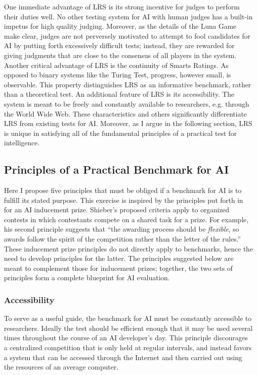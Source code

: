 One immediate advantage of LRS is its strong incentive for judges to perform their duties well. No other testing system for AI with human judges has a built-in impetus for high quality judging. Moreover, as the details of the Luna Game make clear, judges are not perversely motivated to attempt to fool candidates for AI by putting forth excessively difficult tests; instead, they are rewarded for giving judgments that are close to the consensus of all players in the system. Another critical advantage of LRS is the continuity of Smarts Ratings. As opposed to binary systems like the Turing Test, progress, however small, is observable. This property distinguishes LRS as an informative benchmark, rather than a theoretical test. An additional feature of LRS is its accessibility. The system is meant to be freely and constantly available to researchers, e.g. through the World Wide Web. These characteristics and others significantly differentiate LRS from existing tests for AI. Moreover, as I argue in the following section, LRS is unique in satisfying all of the fundamental principles of a practical test for intelligence.

\subsection{Principles of a Practical Benchmark for AI}

Here I propose five principles that must be obliged if a benchmark for AI is to fulfill its stated purpose. This exercise is inspired by the principles put forth in \citet{shieber2015} for an AI inducement prize. Shieber's proposed criteria apply to organized contests in which contestants compete on a shared task for a prize. For example, his second principle suggests that ``the awarding process should be \textit{flexible}, so awards follow the spirit of the competition rather than the letter of the rules.'' These inducement prize principles do not directly apply to benchmarks, hence the need to develop principles for the latter. The principles suggested below are meant to complement those for inducement prizes; together, the two sets of principles form a complete blueprint for AI evaluation.

\subsubsection{Accessibility}
To serve as a useful guide, the benchmark for AI must be constantly accessible to researchers. Ideally the test should be efficient enough that it may be used several times throughout the course of an AI developer's day. This principle discourages a centralized competition that is only held at regular intervals, and instead favors a system that can be accessed through the Internet and then carried out using the resources of an average computer.

